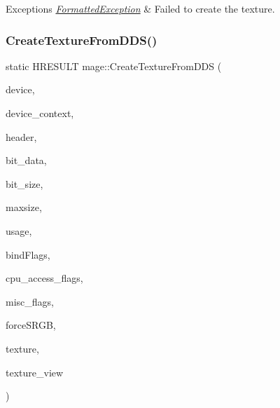 \begin{DoxyExceptions}{Exceptions}
{\em \hyperlink{structmage_1_1_formatted_exception}{Formatted\+Exception}} & Failed to create the texture. \\
\hline
\end{DoxyExceptions}
\hypertarget{namespacemage_a53fb464961d52002316f17c59ce58078}{}\label{namespacemage_a53fb464961d52002316f17c59ce58078} 
\subsubsection{\texorpdfstring{Create\+Texture\+From\+D\+D\+S()}{CreateTextureFromDDS()}}
{\footnotesize\ttfamily static H\+R\+E\+S\+U\+LT mage\+::\+Create\+Texture\+From\+D\+DS (\begin{DoxyParamCaption}\item[{\+\_\+\+In\+\_\+ I\+D3\+D11\+Device2 $\ast$}]{device,  }\item[{\+\_\+\+In\+\_\+opt\+\_\+ I\+D3\+D11\+Device\+Context $\ast$}]{device\+\_\+context,  }\item[{\+\_\+\+In\+\_\+ const \hyperlink{structmage_1_1_d_d_s___h_e_a_d_e_r}{D\+D\+S\+\_\+\+H\+E\+A\+D\+ER} $\ast$}]{header,  }\item[{\+\_\+\+In\+\_\+reads\+\_\+bytes\+\_\+(bit\+\_\+size) const uint8\+\_\+t $\ast$}]{bit\+\_\+data,  }\item[{\+\_\+\+In\+\_\+ size\+\_\+t}]{bit\+\_\+size,  }\item[{\+\_\+\+In\+\_\+ size\+\_\+t}]{maxsize,  }\item[{\+\_\+\+In\+\_\+ D3\+D11\+\_\+\+U\+S\+A\+GE}]{usage,  }\item[{\+\_\+\+In\+\_\+ uint32\+\_\+t}]{bind\+Flags,  }\item[{\+\_\+\+In\+\_\+ uint32\+\_\+t}]{cpu\+\_\+access\+\_\+flags,  }\item[{\+\_\+\+In\+\_\+ uint32\+\_\+t}]{misc\+\_\+flags,  }\item[{\+\_\+\+In\+\_\+ bool}]{force\+S\+R\+GB,  }\item[{\+\_\+\+Outptr\+\_\+opt\+\_\+ I\+D3\+D11\+Resource $\ast$$\ast$}]{texture,  }\item[{\+\_\+\+Outptr\+\_\+opt\+\_\+ I\+D3\+D11\+Shader\+Resource\+View $\ast$$\ast$}]{texture\+\_\+view }\end{DoxyParamCaption})\hspace{0.3cm}{\ttfamily [static]}}

